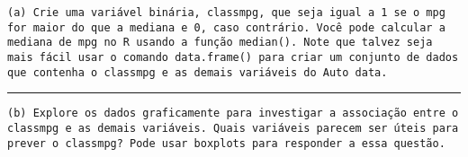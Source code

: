 \documentclass[]{article}
\newenvironment{Shaded}{\begin{snugshade}}{\end{snugshade}}
\newcommand{\KeywordTok}[1]{\textcolor[rgb]{0.13,0.29,0.53}{\textbf{#1}}}
\newcommand{\DataTypeTok}[1]{\textcolor[rgb]{0.13,0.29,0.53}{#1}}
\newcommand{\DecValTok}[1]{\textcolor[rgb]{0.00,0.00,0.81}{#1}}
\newcommand{\StringTok}[1]{\textcolor[rgb]{0.31,0.60,0.02}{#1}}
\newcommand{\OperatorTok}[1]{\textcolor[rgb]{0.81,0.36,0.00}{\textbf{#1}}}
\newcommand{\NormalTok}[1]{#1}
\begin{document}
\begin{verbatim}
(a) Crie uma variável binária, classmpg, que seja igual a 1 se o mpg for maior do que a mediana e 0, caso contrário. Você pode calcular a mediana de mpg no R usando a função median(). Note que talvez seja mais fácil usar o comando data.frame() para criar um conjunto de dados que contenha o classmpg e as demais variáveis do Auto data.
\end{verbatim}

\begin{Shaded}
\end{Shaded}

\begin{center}\rule{0.5\linewidth}{\linethickness}\end{center}

\begin{verbatim}
(b) Explore os dados graficamente para investigar a associação entre o classmpg e as demais variáveis. Quais variáveis parecem ser úteis para prever o classmpg? Pode usar boxplots para responder a essa questão.
\end{verbatim}

\begin{Shaded}
\end{Shaded}
\end{document}
